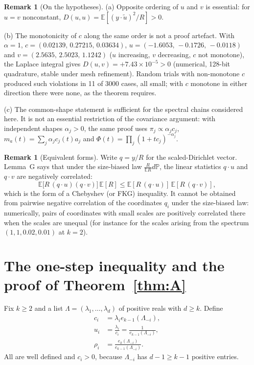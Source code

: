 \documentclass[11pt,a4paper]{article}
\theoremstyle{definition}
\newtheorem{remark}[theorem]{Remark}
\newcommand{\E}{\mathbb{E}}
\newcommand{\PP}{\mathbb{P}}
\begin{document}
\begin{remark}[On the hypotheses]\label{rem:Ghyp}
(a) Opposite ordering of $u$ and $v$ is essential: for $u=v$ nonconstant, $D(u,u)=\E[(y\cdot\tilde u)^2/R]>0$.

(b) The monotonicity of $c$ along the same order is not a proof artefact. With $\alpha=1$, $c=(0.02139,\,0.27215,\,0.03634)$, $u=(-1.6053,\,-0.1726,\,-0.0118)$ and $v=(2.5635,\,2.5023,\,1.1242)$ ($u$ increasing, $v$ decreasing, $c$ not monotone), the Laplace integral gives $D(u,v)=+7.43\times10^{-5}>0$ (numerical, 128-bit quadrature, stable under mesh refinement). Random trials with non-monotone $c$ produced such violations in 11 of 3000 cases, all small; with $c$ monotone in either direction there were none, as the theorem requires.

(c) The common-shape statement is sufficient for the spectral chains considered here. It is not an essential restriction of the covariance argument: with independent shapes $\alpha_j>0$, the same proof uses $\pi_j\propto\alpha_jc_j$, $m_a(t)=\sum_j\alpha_jc_j(t)a_j$ and $\Phi(t)=\prod_j(1+tc_j)^{-\alpha_j}$.
\end{remark}

\begin{remark}[Equivalent forms]\label{rem:Gforms}
Write $q=y/R$ for the scaled-Dirichlet vector. Lemma~G says that under the size-biased law $\frac R{\E R}d\PP$, the linear statistics $q\cdot u$ and $q\cdot v$ are negatively correlated:
\[
\E\big[R\,(q\cdot u)(q\cdot v)\big]\,\E[R]\le\E[R\,(q\cdot u)]\,\E[R\,(q\cdot v)],
\]
which is the form of a Chebyshev (or FKG) inequality. It cannot be obtained from pairwise negative correlation of the coordinates $q_i$ under the size-biased law: numerically, pairs of coordinates with small scales are positively correlated there when the scales are unequal (for instance for the scales arising from the spectrum $(1,1,0.02,0.01)$ at $k=2$).
\end{remark}
\section{The one-step inequality and the proof of Theorem~\ref{thm:A}}\label{sec:proof}

Fix $k\ge2$ and a list $\Lambda=(\lambda_1,\dots,\lambda_d)$ of positive reals with $d\ge k$. Define
\[
\begin{aligned}
c_i&=\lambda_i e_{k-1}(\Lambda_{-i}),\\
u_i&=\frac{\lambda_i}{c_i}=\frac1{e_{k-1}(\Lambda_{-i})},\\
\rho_i&=\frac{e_k(\Lambda_{-i})}{e_{k-1}(\Lambda_{-i})}.
\end{aligned}
\]
All are well defined and $c_i>0$, because $\Lambda_{-i}$ has $d-1\ge k-1$ positive entries.
\end{document}
